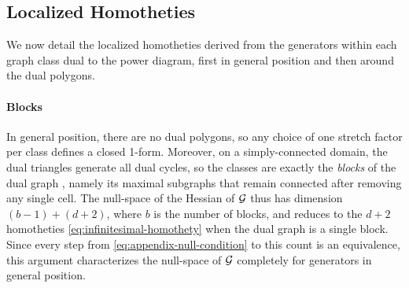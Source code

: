 \documentclass[main.tex]{subfiles}
\begin{document}
\subsection{Localized Homotheties}
\label{sec:appendix-nullspace-localized}

We now detail the localized homotheties derived from the generators within each graph class dual to the power diagram, first in general position and then around the dual polygons.

\paragraph{Blocks}
In general position, there are no dual polygons, so any choice of one stretch factor per class defines a closed 1-form.
Moreover, on a simply-connected domain, the dual triangles generate all dual cycles, so the classes are exactly the \emph{blocks} of the dual graph \citep{Diestel2017Graph}, namely its maximal subgraphs that remain connected after removing any single cell.
The null-space of the Hessian of $\mathcal{G}$ thus has dimension $(b - 1) + (d + 2)$, where $b$ is the number of blocks, and reduces to the $d\!+\!2$ homotheties \eqref{eq:infinitesimal-homothety} when the dual graph is a single block.
Since every step from \eqref{eq:appendix-null-condition} to this count is an equivalence, this argument characterizes the null-space of $\mathcal{G}$ completely for generators in general position.
\end{document}
